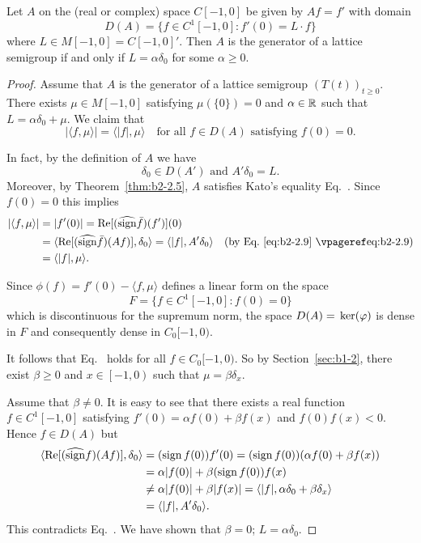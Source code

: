 \begin{example}\label{ex:b2-2.13}
Let $A$ on the (real or complex) space $C[-1,0]$ be given by $Af = f'$ with domain 
%
\[
	D(A) = \{f \in C^{1}[-1,0] \colon f'(0) = L \cdot f\}
\]
%
where $L \in M[-1,0] = C[-1,0]'$.
Then $A$ is the generator of a lattice semigroup if and only if\/ $L = \alpha\delta_{0}$ for some $\alpha \geq 0$.
\end{example}
\begin{proof}
Assume that $A$ is the generator of a lattice semigroup $(T(t))_{t \geq 0}$.
There exists $\mu \in M[-1,0]$ satisfying $\mu(\{0\}) = 0$ and $\alpha \in \mathbb{R}$ such that $L = \alpha\delta_{0} + \mu$.
We claim that
\begin{equation}\label{eq:b2-2.18}
|\langle f,\mu \rangle| = \langle |f|,\mu \rangle \quad \text{for all } f \in D(A) \text{ satisfying } f(0) = 0.
\end{equation}

In fact, by the definition of\/ $A$ we have
\begin{equation}\label{eq:b2-2.19}
\delta_{0} \in D(A') \text{ and } A'\delta_{0} = L.
\end{equation}
Moreover, by Theorem~\ref{thm:b2-2.5}, $A$ satisfies Kato's equality Eq.~.
Since $f(0) = 0$ this implies
\begin{align*}
|\langle f,\mu \rangle| &= |f'(0)| = \Re[(\widehat{\sign} \bar{f})(f')](0) \\
&= \langle \Re[(\widehat{\sign} \bar{f})(Af)],\delta_{0} \rangle = \langle |f|,A'\delta_{0} \rangle \quad \text{(by Eq.~\myeqpageref{eq:b2-2.9})} \\
&= \langle |f|,\mu \rangle.
\end{align*}

Since $\phi(f) = f'(0) - \langle f,\mu \rangle$ defines a linear form on the space 
\[
F = \{f \in C^{1}[-1,0] \colon f(0) = 0\}
\]
 which is discontinuous for the supremum norm, the space $D(A) = \Kern{\phi}$ is dense in $F$ and consequently dense in $C_{0}[-1,0)$.
 
It follows that Eq.~ holds for all $f \in C_{0}[-1,0)$.
So by Section~\ref{sec:b1-2}, there exist $\beta \geq 0$ and $x \in \left[-1,0\right)$ such that $\mu = \beta\delta_{x}$.

Assume that $\beta \neq 0$.
It is easy to see that there exists a real function $f \in C^{1}[-1,0]$ satisfying 
$f'(0) = \alpha f(0) + \beta f(x)$ and $f(0)f(x) < 0$.
Hence $f \in D(A)$ but 
\begin{align*}
\langle \mathop{}\!\mathrm{Re}[(\widehat{\operatorname{sign}} f)(Af)],\delta_{0} \rangle 
	&= (\operatorname{sign} f(0))f'(0) 
	= (\operatorname{sign} f(0))(\alpha f(0) + \beta f(x))\\
	&= \alpha|f(0)| + \beta(\operatorname{sign} f(0))f(x) \\
	&\neq \alpha|f(0)| + \beta|f(x)| 
	= \langle |f|, \alpha\delta_{0} + \beta\delta_{x} \rangle \\ 
	&= \langle |f|,A'\delta_{0} \rangle.
\end{align*}
This contradicts Eq.~.
We have shown that $\beta = 0$; \ie  $L = \alpha\delta_{0}$.


\end{proof}
